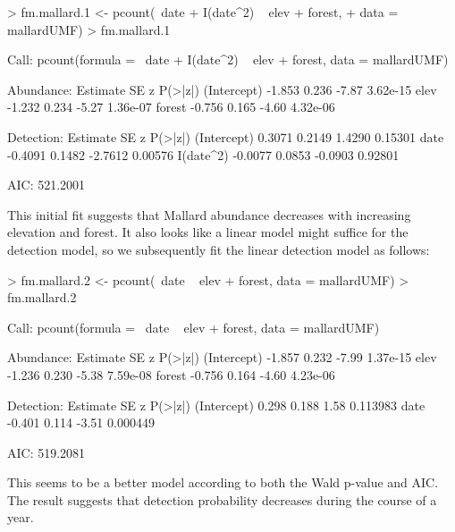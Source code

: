 \documentclass[article,shortnames]{jss}
\begin{document}
\begin{Schunk}
\begin{Sinput}
> fm.mallard.1 <- pcount(~date + I(date^2) ~ elev + forest, 
+     data = mallardUMF)
> fm.mallard.1
\end{Sinput}
\begin{Soutput}
Call:
pcount(formula = ~date + I(date^2) ~ elev + forest, data = mallardUMF)

Abundance:
            Estimate    SE     z  P(>|z|)
(Intercept)   -1.853 0.236 -7.87 3.62e-15
elev          -1.232 0.234 -5.27 1.36e-07
forest        -0.756 0.165 -4.60 4.32e-06

Detection:
            Estimate     SE       z P(>|z|)
(Intercept)   0.3071 0.2149  1.4290 0.15301
date         -0.4091 0.1482 -2.7612 0.00576
I(date^2)    -0.0077 0.0853 -0.0903 0.92801

AIC: 521.2001 
\end{Soutput}
\end{Schunk}

This initial fit suggests that Mallard abundance decreases with
increasing elevation and forest.  It also looks like a linear model
might suffice for the detection model, so we subsequently fit the
linear detection model as follows:


\begin{Schunk}
\begin{Sinput}
> fm.mallard.2 <- pcount(~date ~ elev + forest, data = mallardUMF)
> fm.mallard.2
\end{Sinput}
\begin{Soutput}
Call:
pcount(formula = ~date ~ elev + forest, data = mallardUMF)

Abundance:
            Estimate    SE     z  P(>|z|)
(Intercept)   -1.857 0.232 -7.99 1.37e-15
elev          -1.236 0.230 -5.38 7.59e-08
forest        -0.756 0.164 -4.60 4.23e-06

Detection:
            Estimate    SE     z  P(>|z|)
(Intercept)    0.298 0.188  1.58 0.113983
date          -0.401 0.114 -3.51 0.000449

AIC: 519.2081 
\end{Soutput}
\end{Schunk}

This seems to be a better model according to both the Wald p-value and
AIC.  The result suggests that detection probability decreases during the 
course of a year.
\end{document}
